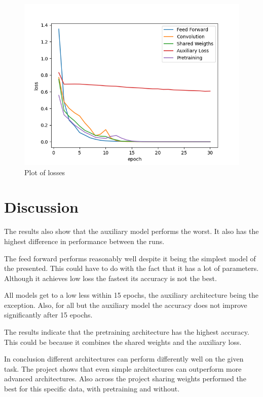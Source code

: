 \documentclass[12pt]{article}
\begin{document}
\begin{figure}[h]
\centering
\includegraphics[width=\textwidth]{"losss.png"}
\caption{Plot of losses}
\end{figure}
\section{Discussion}
The results also show that the auxiliary model performs the worst.
It also has the highest difference in performance between the runs.

The feed forward performs reasonably well despite it being the simplest model of the presented.
This could have to do with the fact that it has a lot of parameters.
Although it achieves low loss the fastest its accuracy is not the best.

All models get to a low less within 15 epochs, the auxiliary architecture being the exception.
Also, for all but the auxiliary model the accuracy does not improve significantly after 15 epochs.

The results indicate that the pretraining architecture has the highest accuracy.
This could be because it combines the shared weights and the auxiliary loss.

In conclusion different architectures can perform differently well on the given task.
The project shows that even simple architectures can outperform more advanced architectures.
Also across the project sharing weights performed the best for this specific data, with pretraining and without.
\end{document}
